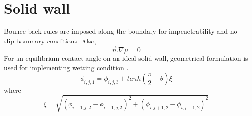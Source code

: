 \documentclass[11pt]{article}
\begin{document}
\section{Solid wall}
Bounce-back rules \cite{paper:bounce_back} are imposed along the boundary for impenetrability and no-slip boundary conditions. Also,
\begin{equation}
	\vec{n}.\nabla\mu = 0
\end{equation}
 For an equilibrium contact angle on an ideal solid wall, geometrical formulation is used for implementing wetting condition \cite{paper:contact_angle,PhysRevE.75.046708}.
 \begin{equation}
 \phi_{i,j,1} = \phi_{i,j,3} + tanh(\frac{\pi}{2}-\theta) \xi
 \end{equation}
 where 
 \begin{equation}
 	\xi = \sqrt{(\phi_{i+1,j,2}-\phi_{i-1,j,2})^{2}+(\phi_{i,j+1,2}-\phi_{i,j-1,2})^{2}}
 \label{eqn_wetting_bc}
 \end{equation}
\end{document}
